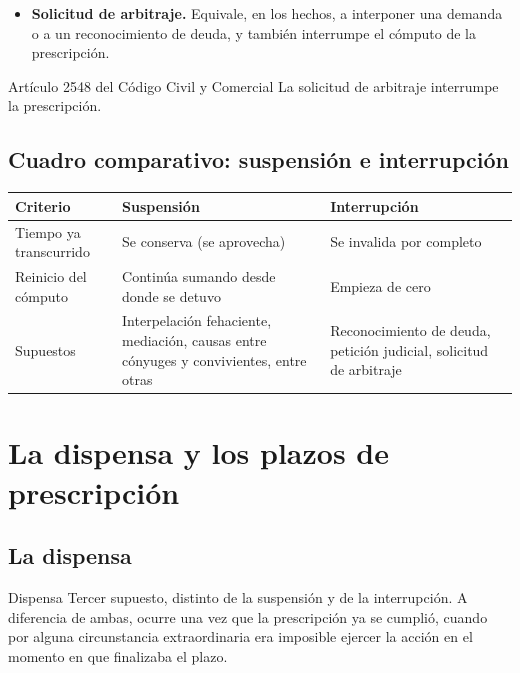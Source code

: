 \documentclass[12pt,oneside]{book}
\begin{document}
\begin{itemize}
    \item \textbf{Solicitud de arbitraje.} Equivale, en los hechos, a interponer una demanda o a un reconocimiento de deuda, y también interrumpe el cómputo de la prescripción.
\end{itemize}

\begin{articulo}{Artículo 2548 del Código Civil y Comercial}
La solicitud de arbitraje interrumpe la prescripción.
\end{articulo}

\subsection{Cuadro comparativo: suspensión e interrupción}

\begin{table}[H]
\centering
\begin{tabularx}{\textwidth}{
    >{\raggedright\arraybackslash}p{3.3cm}
    >{\raggedright\arraybackslash}X
    >{\raggedright\arraybackslash}X
}
\toprule
\textbf{Criterio} & \textbf{Suspensión} & \textbf{Interrupción} \\
\midrule
Tiempo ya transcurrido & Se conserva (se aprovecha) & Se invalida por completo \\
\addlinespace
Reinicio del cómputo & Continúa sumando desde donde se detuvo & Empieza de cero \\
\addlinespace
Supuestos & Interpelación fehaciente, mediación, causas entre cónyuges y convivientes, entre otras & Reconocimiento de deuda, petición judicial, solicitud de arbitraje \\
\bottomrule
\end{tabularx}
\end{table}

\section{La dispensa y los plazos de prescripción}

\subsection{La dispensa}

\begin{definition}{Dispensa}
Tercer supuesto, distinto de la suspensión y de la interrupción. A diferencia de ambas, ocurre una vez que la prescripción ya se cumplió, cuando por alguna circunstancia extraordinaria era imposible ejercer la acción en el momento en que finalizaba el plazo.
\end{definition}
\end{document}
